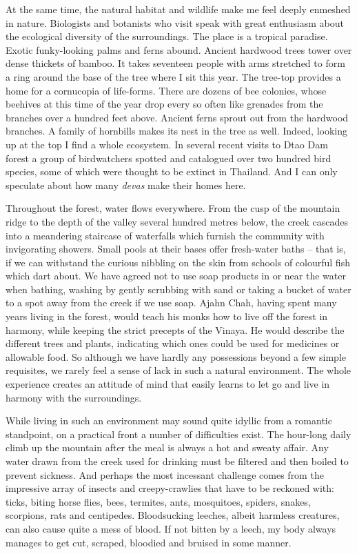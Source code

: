 At the same time, the natural habitat and wildlife make me feel deeply
enmeshed in nature. Biologists and botanists who visit speak with great
enthusiasm about the ecological diversity of the surroundings. The place
is a tropical paradise. Exotic funky-looking palms and ferns abound.
Ancient hardwood trees tower over dense thickets of bamboo. It takes
seventeen people with arms stretched to form a ring around the base of
the tree where I sit this year. The tree-top provides a home for a
cornucopia of life-forms. There are dozens of bee colonies, whose
beehives at this time of the year drop every so often like grenades from
the branches over a hundred feet above. Ancient ferns sprout out from
the hardwood branches. A family of hornbills makes its nest in the tree
as well. Indeed, looking up at the top I find a whole ecosystem. In
several recent visits to Dtao Dam forest a group of birdwatchers spotted
and catalogued over two hundred bird species, some of which were thought
to be extinct in Thailand. And I can only speculate about how many
\emph{devas} make their homes here.

Throughout the forest, water flows everywhere. From the cusp of the
mountain ridge to the depth of the valley several hundred metres below,
the creek cascades into a meandering staircase of waterfalls which
furnish the community with invigorating showers. Small pools at their
bases offer fresh-water baths -- that is, if we can withstand the
curious nibbling on the skin from schools of colourful fish which dart
about. We have agreed not to use soap products in or near the water when
bathing, washing by gently scrubbing with sand or taking a bucket of
water to a spot away from the creek if we use soap. Ajahn Chah, having
spent many years living in the forest, would teach his monks how to live
off the forest in harmony, while keeping the strict precepts of the
Vinaya. He would describe the different trees and plants, indicating
which ones could be used for medicines or allowable food. So although we
have hardly any possessions beyond a few simple requisites, we rarely
feel a sense of lack in such a natural environment. The whole experience
creates an attitude of mind that easily learns to let go and live in
harmony with the surroundings.

While living in such an environment may sound quite idyllic from a
romantic standpoint, on a practical front a number of difficulties
exist. The hour-long daily climb up the mountain after the meal is
always a hot and sweaty affair. Any water drawn from the creek used for
drinking must be filtered and then boiled to prevent sickness. And
perhaps the most incessant challenge comes from the impressive array of
insects and creepy-crawlies that have to be reckoned with: ticks, biting
horse flies, bees, termites, ants, mosquitoes, spiders, snakes,
scorpions, rats and centipedes. Bloodsucking leeches, albeit harmless
creatures, can also cause quite a mess of blood. If not bitten by a
leech, my body always manages to get cut, scraped, bloodied and bruised
in some manner.

